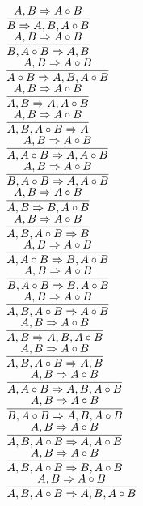 \documentclass[11pt]{article}
\begin{document}
\begin{center}
\bigskip
\\$\infer{B\Rightarrow A, B, A\circ B}{A, B\Rightarrow A\circ B}$
\bigskip
\\$\infer{B, A\circ B\Rightarrow A, B}{A, B\Rightarrow A\circ B}$
\bigskip
\\$\infer{A\circ B\Rightarrow A, B, A\circ B}{A, B\Rightarrow A\circ B}$
\bigskip
\\$\infer{A, B\Rightarrow A, A\circ B}{A, B\Rightarrow A\circ B}$
\bigskip
\\$\infer{A, B, A\circ B\Rightarrow A}{A, B\Rightarrow A\circ B}$
\bigskip
\\$\infer{A, A\circ B\Rightarrow A, A\circ B}{A, B\Rightarrow A\circ B}$
\bigskip
\\$\infer{B, A\circ B\Rightarrow A, A\circ B}{A, B\Rightarrow A\circ B}$
\bigskip
\\$\infer{A, B\Rightarrow B, A\circ B}{A, B\Rightarrow A\circ B}$
\bigskip
\\$\infer{A, B, A\circ B\Rightarrow B}{A, B\Rightarrow A\circ B}$
\bigskip
\\$\infer{A, A\circ B\Rightarrow B, A\circ B}{A, B\Rightarrow A\circ B}$
\bigskip
\\$\infer{B, A\circ B\Rightarrow B, A\circ B}{A, B\Rightarrow A\circ B}$
\bigskip
\\$\infer{A, B, A\circ B\Rightarrow A\circ B}{A, B\Rightarrow A\circ B}$
\bigskip
\\$\infer{A, B\Rightarrow A, B, A\circ B}{A, B\Rightarrow A\circ B}$
\bigskip
\\$\infer{A, B, A\circ B\Rightarrow A, B}{A, B\Rightarrow A\circ B}$
\bigskip
\\$\infer{A, A\circ B\Rightarrow A, B, A\circ B}{A, B\Rightarrow A\circ B}$
\bigskip
\\$\infer{B, A\circ B\Rightarrow A, B, A\circ B}{A, B\Rightarrow A\circ B}$
\bigskip
\\$\infer{A, B, A\circ B\Rightarrow A, A\circ B}{A, B\Rightarrow A\circ B}$
\bigskip
\\$\infer{A, B, A\circ B\Rightarrow B, A\circ B}{A, B\Rightarrow A\circ B}$
\bigskip
\\$\infer{A, B, A\circ B\Rightarrow A, B, A\circ B}{A, B\Rightarrow A\circ B}$
\bigskip
\\
\end{center}
\end{document}
